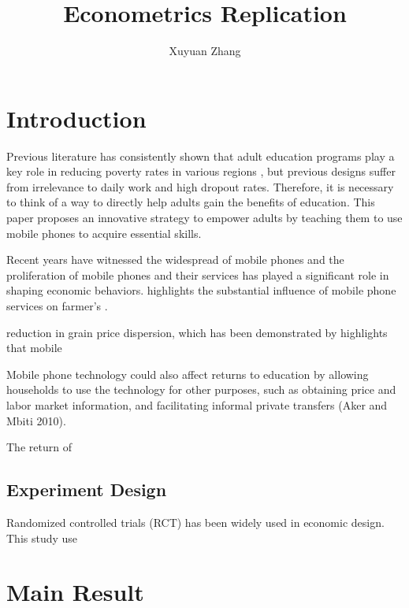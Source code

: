 \documentclass[12pt]{jfm}
\title{Econometrics Replication}
\author{Xuyuan Zhang\aff{1}
  \corresp{\email{\href{mailto:zxuyuan@umich.edu}{zxuyuan@umich.edu}}}}
\affiliation{\aff{1}Department of Economics, University of Michigan, Ann Arbor, USA.}
\begin{document}
\maketitle

\section{Introduction} \label{sec:introduction}

Previous literature has consistently shown that adult education programs play a key role in reducing poverty rates in various regions \citep{RePEc:wbk:wboper:9767, doi:10.1086/590461}, but previous designs suffer from irrelevance to daily work and high dropout rates. Therefore, it is necessary to think of a way to directly help adults gain the benefits of education. This paper proposes an innovative strategy to empower adults by teaching them to use mobile phones to acquire essential skills.

Recent years have witnessed the widespread of mobile phones and the proliferation of mobile phones and their services has played a significant role in shaping economic behaviors.  highlights the substantial influence of mobile phone services on farmer's .


reduction in grain price dispersion, which has been demonstrated by \citep{10.1257/app.2.3.46} highlights that mobile 


 Mobile phone technology 
could also affect returns to education by allowing households to use the technology 
for other purposes, such as obtaining price and labor market information, and facilitating informal private transfers (Aker and Mbiti 2010).

The return of \citep{GONZALEZ2024103228} 

\subsection{Experiment Design} \label{subsec:ExperimentDesign}

Randomized controlled trials (RCT) has been widely used in economic design. This study use
\section{Main Result} \label{sec:mainresult}

\section{}
\end{document}
